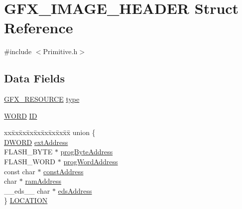 \hypertarget{struct_g_f_x___i_m_a_g_e___h_e_a_d_e_r}{}\section{G\+F\+X\+\_\+\+I\+M\+A\+G\+E\+\_\+\+H\+E\+A\+D\+E\+R Struct Reference}
\label{struct_g_f_x___i_m_a_g_e___h_e_a_d_e_r}


{\ttfamily \#include $<$Primitive.\+h$>$}

\subsection*{Data Fields}
\begin{DoxyCompactItemize}
\item 
\hyperlink{_primitive_8h_a9a3785e6345a6e01071a873d03698baf}{G\+F\+X\+\_\+\+R\+E\+S\+O\+U\+R\+C\+E} \hyperlink{struct_g_f_x___i_m_a_g_e___h_e_a_d_e_r_ad19c8e0d19c638be9dd81d163454b0f1}{type}
\item 
\hyperlink{_generic_type_defs_8h_a2b0e863dadf920709ec53d9088ee7c91}{W\+O\+R\+D} \hyperlink{struct_g_f_x___i_m_a_g_e___h_e_a_d_e_r_a79cf9bf3b48476101422d9b453e0945a}{I\+D}
\item 
\begin{tabbing}
xx\=xx\=xx\=xx\=xx\=xx\=xx\=xx\=xx\=\kill
union \{\\
\>\hyperlink{_generic_type_defs_8h_ad342ac907eb044443153a22f964bf0af}{DWORD} \hyperlink{struct_g_f_x___i_m_a_g_e___h_e_a_d_e_r_addff8af40028024ec1c1b5c9a99eef5a}{extAddress}\\
\>FLASH\_BYTE $\ast$ \hyperlink{struct_g_f_x___i_m_a_g_e___h_e_a_d_e_r_a3b2bd1d5ac28196c49d29bf04d08bc95}{progByteAddress}\\
\>FLASH\_WORD $\ast$ \hyperlink{struct_g_f_x___i_m_a_g_e___h_e_a_d_e_r_a9fd6c0e38b2c568b1f249e221c124ed4}{progWordAddress}\\
\>const char $\ast$ \hyperlink{struct_g_f_x___i_m_a_g_e___h_e_a_d_e_r_a1fc3ef75cadd39c2aafed4bf079f7c72}{constAddress}\\
\>char $\ast$ \hyperlink{struct_g_f_x___i_m_a_g_e___h_e_a_d_e_r_a349bf1673b26cefda4930d1cbea36829}{ramAddress}\\
\>\_\_eds\_\_ char $\ast$ \hyperlink{struct_g_f_x___i_m_a_g_e___h_e_a_d_e_r_a1cf322895744ed620fc321a8b447a97d}{edsAddress}\\
\} \hyperlink{struct_g_f_x___i_m_a_g_e___h_e_a_d_e_r_aaf83897d591e50febe781218915e3872}{LOCATION}\\


\end{tabbing}
\end{DoxyCompactItemize}
